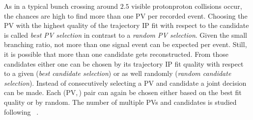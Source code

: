 As in a typical \LHCb bunch crossing around $\num{2.5}$ visible
\acl{protonproton} collisions occur, the chances are high to find more than one
\acl{PV} per recorded event. Choosing the \acl{PV} with the highest quality of
the trajectory \acl{IP} \DTF fit with respect to the \Bd candidate is called
\emph{best PV selection} in contrast to a \emph{random PV selection}. Given the
small \BdToJpsiKS branching ratio, not more than one signal event can be
expected per event. Still, it is possible that more than one candidate gets
reconstructed. From those candidates either one can be chosen by its \DTF
trajectory \acl{IP} fit quality with respect to a given \PV (\emph{best \Bd
candidate selection}) or as well randomly (\emph{random \Bd candidate
selection}). Instead of consecutively selecting a \acl{PV} and \Bmeson candidate
a joint decision can be made. Each (\acs{PV},\,\Bd) pair can again be chosen
either based on the best fit quality or by random. The number of multiple
\aclp{PV} and candidates is studied following \Ref~\cite{Koppenburg:1340942}.


